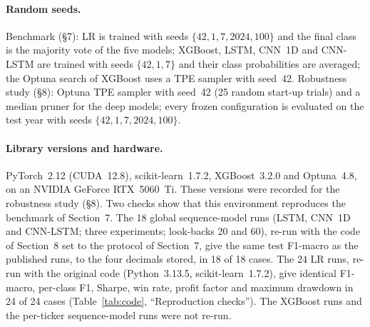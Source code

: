 \documentclass[10pt]{article}
\begin{document}
\paragraph{Random seeds.} Benchmark (\S7): LR is trained with seeds $\{42, 1, 7, 2024, 100\}$ and
the final class is the majority vote of the five models; XGBoost, LSTM, CNN~1D and CNN-LSTM are
trained with seeds $\{42, 1, 7\}$ and their class probabilities are averaged; the Optuna search of
XGBoost uses a TPE sampler with seed~42. Robustness study (\S8): Optuna TPE sampler with seed~42
(25 random start-up trials) and a median pruner for the deep models; every frozen configuration is
evaluated on the test year with seeds $\{42, 1, 7, 2024, 100\}$.

\paragraph{Library versions and hardware.} PyTorch~2.12 (CUDA~12.8), scikit-learn~1.7.2,
XGBoost~3.2.0 and Optuna~4.8, on an NVIDIA GeForce RTX~5060~Ti. These versions were recorded for
the robustness study (\S8). Two checks show that this environment reproduces the benchmark of
Section~7. The 18 global sequence-model runs (LSTM, CNN~1D and CNN-LSTM; three experiments;
look-backs 20 and 60), re-run with the code of Section~8 set to the protocol of Section~7, give the
same test F1-macro as the published runs, to the four decimals stored, in 18 of 18 cases. The 24 LR
runs, re-run with the original code (Python~3.13.5, scikit-learn~1.7.2), give identical F1-macro,
per-class F1, Sharpe, win rate, profit factor and maximum drawdown in 24 of 24 cases
(Table~\ref{tab:code}, ``Reproduction checks''). The XGBoost runs and the per-ticker
sequence-model runs were not re-run.
\end{document}
